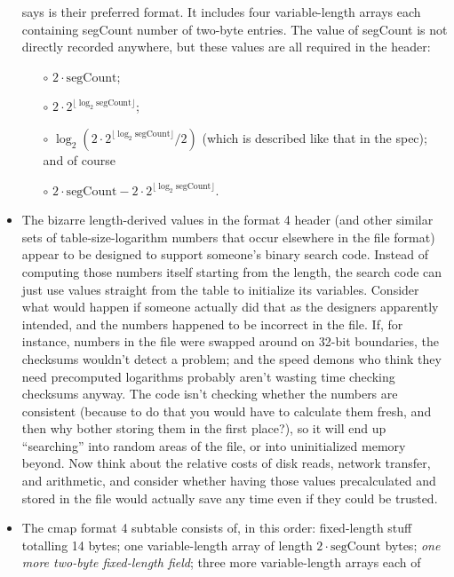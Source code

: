 \documentclass[twocolumn]{report}
\begin{document}
\begin{itemize}
    says is their preferred format.  It includes four
    variable-length arrays each containing segCount
    number of two-byte entries.  The value of segCount is not directly
    recorded anywhere, but these values are all required
    in the header:
    \begin{itemize}
      \item[$\circ$] $2 \cdot \textrm{segCount}$;
      \item[$\circ$] $2 \cdot 2^{\lfloor \log_2 \textrm{segCount} \rfloor}$;
      \item[$\circ$] $\log_2 (2 \cdot 2^{\lfloor \log_2 \textrm{segCount}
        \rfloor}/2)$ (which is described like that in the spec);
        and of course
      \item[$\circ$] $2 \cdot \textrm{segCount}-2 \cdot 2^{\lfloor \log_2
        \textrm{segCount} \rfloor}$.
    \end{itemize}
  \item The bizarre length-derived values in the format 4 header (and
    other similar sets of table-size-logarithm numbers that occur
    elsewhere in the file format) appear to be designed to support
    someone's binary search code.  Instead of computing those numbers
    itself starting from the length, the search code can just use
    values straight from the table to initialize its variables.
    Consider what would happen if someone actually did that as the
    designers apparently intended, and the numbers happened to be incorrect
    in the file.  If, for instance, numbers in the file were swapped
    around on 32-bit boundaries, the checksums wouldn't detect a problem; and
    the speed demons who think they need precomputed logarithms
    probably aren't wasting time checking checksums anyway.
    The code isn't checking whether the numbers are consistent (because
    to do that you would have to calculate them fresh, and then why bother
    storing them in the first place?), so it will end up ``searching'' into
    random areas of the file, or into uninitialized memory beyond.  Now
    think about the relative costs of disk reads, network transfer, and
    arithmetic, and consider whether having those values precalculated
    and stored in the file would actually save any time even if they
    could be trusted.
  \item The cmap format 4 subtable consists of, in this order: fixed-length
    stuff totalling 14 bytes; one variable-length array of length $2
    \cdot \textrm{segCount}$ bytes; \emph{one more two-byte
    fixed-length field}; three more variable-length arrays each of

\end{itemize}
\end{document}
